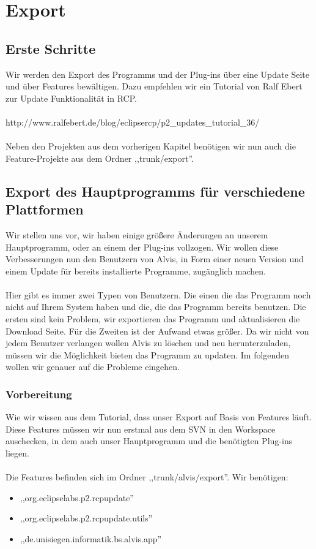 \documentclass[10pt,a4paper,oneside]{scrbook}
\begin{document}
\newpage
\chapter{Export}
\section{Erste Schritte}
Wir werden den Export des Programms und der Plug-ins über eine Update Seite und über Features bewältigen. Dazu empfehlen wir ein Tutorial von Ralf Ebert zur Update Funktionalität in RCP.
\\ \\
http://www.ralfebert.de/blog/eclipsercp/p2\_updates\_tutorial\_36/
\\ \\
Neben den Projekten aus dem vorherigen Kapitel benötigen wir nun auch die Feature-Projekte aus dem Ordner ,,trunk/export''.

\section{Export des Hauptprogramms für verschiedene Plattformen}
Wir stellen uns vor, wir haben einige größere Änderungen an unserem Hauptprogramm, oder an einem der Plug-ins vollzogen. Wir wollen diese Verbesserungen nun den Benutzern von Alvis, in Form einer neuen Version und einem Update für bereits installierte Programme, zugänglich machen. 
\\ \\
Hier gibt es immer zwei Typen von Benutzern. Die einen die das Programm noch nicht auf Ihrem System haben und die, die das Programm bereits benutzen. Die ersten sind kein Problem, wir exportieren das Programm und aktualisieren die Download Seite. Für die Zweiten ist der Aufwand etwas größer. Da wir nicht von jedem Benutzer verlangen wollen Alvis zu löschen und neu herunterzuladen, müssen wir die Möglichkeit bieten das Programm zu updaten. Im folgenden wollen wir genauer auf die Probleme eingehen.
\subsection{Vorbereitung}
Wie wir wissen aus dem Tutorial, dass unser Export auf Basis von Features läuft. Diese Features müssen wir nun erstmal aus dem SVN in den Workspace auschecken, in dem auch unser Hauptprogramm und die benötigten Plug-ins liegen.
\\ \\
Die Features befinden sich im Ordner ,,trunk/alvis/export''.
Wir benötigen:
\begin{itemize}
\item ,,org.eclipselabs.p2.rcpupdate''
\item ,,org.eclipselabs.p2.rcpupdate.utils''
\item ,,de.unisiegen.informatik.bs.alvis.app''
\end{itemize}
\end{document}
